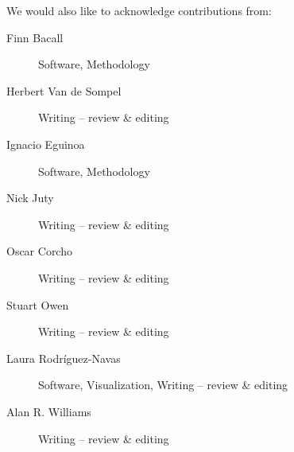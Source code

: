 \documentclass[ds,v1.1.2,openaccess]{iosart2x}%
\begin{document}
We would also like to acknowledge contributions from:
\begin{description}
\item[Finn Bacall]
 Software, Methodology

\item[Herbert Van de Sompel]
 Writing -- review \& editing

\item[Ignacio Eguinoa]
 Software, Methodology

\item[Nick Juty]
 Writing -- review \& editing

\item[Oscar Corcho]
 Writing -- review \& editing

\item[Stuart Owen]
 Writing -- review \& editing

\item[Laura Rodr\'iguez-Navas]
 Software, Visualization, Writing -- review \& editing

\item[Alan R. Williams]
 Writing -- review \& editing
\end{description}
\end{document}
